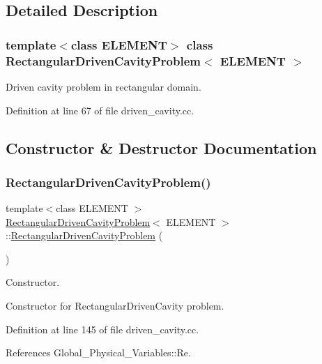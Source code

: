 \subsection{Detailed Description}
\subsubsection*{template$<$class E\+L\+E\+M\+E\+NT$>$\newline
class Rectangular\+Driven\+Cavity\+Problem$<$ E\+L\+E\+M\+E\+N\+T $>$}

Driven cavity problem in rectangular domain. 

Definition at line 67 of file driven\+\_\+cavity.\+cc.



\subsection{Constructor \& Destructor Documentation}
\mbox{\label{classRectangularDrivenCavityProblem_ad7382f68a780f86ea5f0e9b7d4d119ec}} 
\subsubsection{\texorpdfstring{Rectangular\+Driven\+Cavity\+Problem()}{RectangularDrivenCavityProblem()}}
{\footnotesize\ttfamily template$<$class E\+L\+E\+M\+E\+NT $>$ \\
\hyperlink{classRectangularDrivenCavityProblem}{Rectangular\+Driven\+Cavity\+Problem}$<$ E\+L\+E\+M\+E\+NT $>$\+::\hyperlink{classRectangularDrivenCavityProblem}{Rectangular\+Driven\+Cavity\+Problem} (\begin{DoxyParamCaption}{ }\end{DoxyParamCaption})}



Constructor. 

Constructor for Rectangular\+Driven\+Cavity problem. 

Definition at line 145 of file driven\+\_\+cavity.\+cc.



References Global\+\_\+\+Physical\+\_\+\+Variables\+::\+Re.

